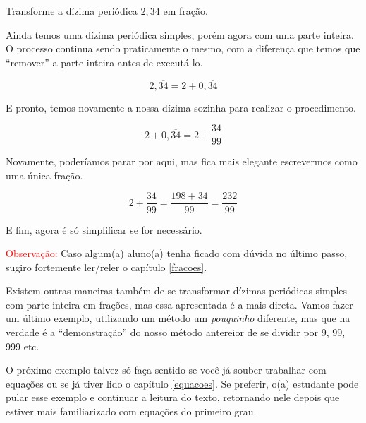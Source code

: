 \begin{exemplo}
    Transforme a dízima periódica \(2,\overline{34}\) em fração.

    \vspace{0.5cm}

    Ainda temos uma dízima periódica simples, porém agora com uma parte inteira. O processo continua sendo praticamente o mesmo, com a diferença que temos que ``remover'' a parte inteira antes de executá-lo.

    \begin{equation}
        2,\overline{34}=2+0,\overline{34}
    \end{equation}

    E pronto, temos novamente a nossa dízima sozinha para realizar o procedimento.

    \begin{equation}
        2+0,\overline{34}=2+\frac{34}{99}
    \end{equation}

    Novamente, poderíamos parar por aqui, mas fica mais elegante escrevermos como uma única fração.

    \begin{equation}
        2+\frac{34}{99}=\frac{198+34}{99}=\frac{232}{99}
    \end{equation}

    E fim, agora é só simplificar se for necessário.

    \vspace{0.5cm}

    \textcolor{red}{Observação:} Caso algum(a) aluno(a) tenha ficado com dúvida no último passo, sugiro fortemente ler/reler o capítulo \ref{fracoes}.
\end{exemplo}

Existem outras maneiras também de se transformar dízimas periódicas simples com parte inteira em frações, mas essa apresentada é a mais direta. Vamos fazer um último exemplo, utilizando um método um \textit{pouquinho} diferente, mas que na verdade é a ``demonstração'' do nosso método antereior de se dividir por 9, 99, 999 etc.

\begin{tcolorbox}[title=IMPORTANTE]
    O próximo exemplo talvez só faça sentido se você já souber trabalhar com equações ou se já tiver lido o capítulo \ref{equacoes}. Se preferir, o(a) estudante pode pular esse exemplo e continuar a leitura do texto, retornando nele depois que estiver mais familiarizado com equações do primeiro grau.
\end{tcolorbox}

